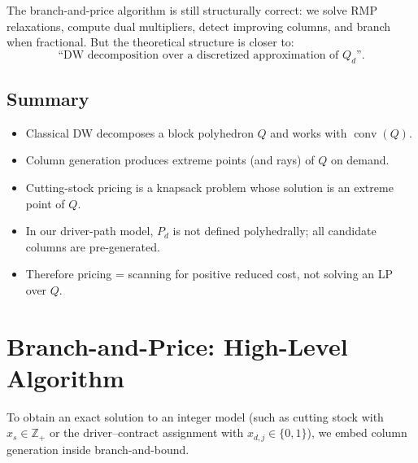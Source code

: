 \documentclass[11pt]{article}
\begin{document}
The branch-and-price algorithm is still structurally correct:
we solve RMP relaxations, compute dual multipliers, detect improving columns,
and branch when fractional.
But the theoretical structure is closer to:
\[
    \text{``DW decomposition over a discretized approximation of } Q_d\text{''.}
\]

\subsection{Summary}

\begin{itemize}
    \item Classical DW decomposes a block polyhedron $Q$ and works with
          $\operatorname{conv}(Q)$.
    \item Column generation produces extreme points (and rays) of $Q$ on demand.
    \item Cutting-stock pricing is a knapsack problem whose solution is an extreme point of $Q$.
    \item In our driver-path model, $P_d$ is not defined polyhedrally;
          all candidate columns are pre-generated.
    \item Therefore pricing = scanning for positive reduced cost, not
          solving an LP over $Q$.
\end{itemize}


\section{Branch-and-Price: High-Level Algorithm}

To obtain an exact solution to an integer model (such as cutting stock with
$x_s \in \mathbb{Z}_+$ or the driver--contract assignment with
$x_{d,j} \in \{0,1\}$), we embed column generation inside branch-and-bound.
\end{document}
